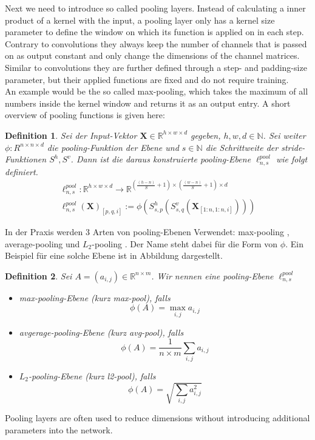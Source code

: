 \documentclass[a4paper,12pt,titlepage,enabledeprecatedfontcommands]{scrreprt}
\newtheorem{definition}{Definition}[chapter]
\begin{document}
Next we need to introduce so called pooling layers. 
Instead of calculating a inner product of a kernel with the input, a pooling layer only has a kernel size parameter to define the window on which its function is applied on in each step. Contrary to convolutions they always keep the number of channels that is passed on as output constant and only change the dimensions of the channel matrices. Similar to convolutions they are further defined through a step- and padding-size parameter, but their applied functions are fixed and do not require training. \\
An example would be the so called max-pooling, which takes the maximum of all numbers inside the kernel window and returns it as an output entry. A short overview of pooling functions is given here: \\
\begin{definition}
Sei der Input-Vektor $\bm{X} \in \mathbb{R}^{h \times w \times d}$ gegeben, $h,w,d \in \mathbb{N}$. Sei weiter $\phi : R^{n \times n \times d}$ die pooling-Funktion der Ebene und $s \in \mathbb{N}$ die Schrittweite der stride-Funktionen $S^{h}, S^{v}$.
Dann ist die daraus konstruierte pooling-Ebene $\ell^{pool}_{n,s}$ wie folgt definiert.
\begin{align*}
\ell^{pool}_{n,s} : \mathbb{R}^{h \times w \times d} \rightarrow \mathbb{R}^{(\frac{(h-n)}{S}+1) \times (\frac{(w-n)}{S}+1) \times d} \\
\ell^{pool}_{n,s}(\bm{X})_{[p,q,i]} := \phi(S^{h}_{s,p}(S^{v}_{s,q}(\bm{X}_{[1:n,1:n,i]})))
\end{align*}
\end{definition}
In der Praxis werden 3 Arten von pooling-Ebenen Verwendet: max-pooling \cite{MaxPool}, average-pooling und $L_2$-pooling \cite{Goodfellow-et-al-2016}. Der Name steht dabei für die Form von $\phi$. Ein Beispiel für eine solche Ebene ist in Abbildung dargestellt.
\begin{definition}
Sei $A = (a_{i,j}) \in \mathbb{R}^{n \times m}$. 
Wir nennen eine pooling-Ebene $\ell^{pool}_{n,s}$
\begin{itemize}
\item max-pooling-Ebene (kurz max-pool), falls
\begin{equation}
\phi(A) = \max_{i,j} a_{i,j}
\end{equation}
\item avgerage-pooling-Ebene (kurz avg-pool), falls
\begin{equation}
\phi(A) = \frac{1}{n \times m} \sum_{i,j} a_{i,j}
\end{equation}
\item $L_2$-pooling-Ebene (kurz l2-pool), falls
\begin{equation}
\phi(A) = \sqrt{\sum_{i,j} a_{i,j}^2}
\end{equation}
\end{itemize}
\end{definition}
Pooling layers are often used to reduce dimensions without introducing additional parameters into the network.
  
\end{document}
